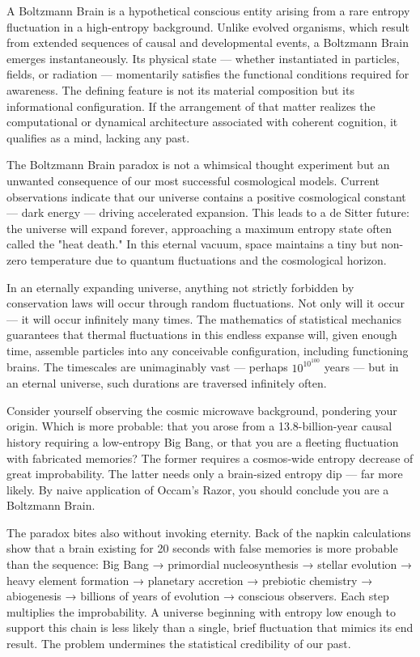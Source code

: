 A Boltzmann Brain is a hypothetical conscious entity arising from a rare entropy fluctuation in a high-entropy background. Unlike evolved organisms, which result from extended sequences of causal and developmental events, a Boltzmann Brain emerges instantaneously. Its physical state — whether instantiated in particles, fields, or radiation — momentarily satisfies the functional conditions required for awareness. The defining feature is not its material composition but its informational configuration. If the arrangement of that matter realizes the computational or dynamical architecture associated with coherent cognition, it qualifies as a mind, lacking any past.

The Boltzmann Brain paradox is not a whimsical thought experiment but an unwanted consequence of our most successful cosmological models. Current observations indicate that our universe contains a positive cosmological constant — dark energy — driving accelerated expansion. This leads to a de Sitter future: the universe will expand forever, approaching a maximum entropy state often called the "heat death." In this eternal vacuum, space maintains a tiny but non-zero temperature due to quantum fluctuations and the cosmological horizon.

In an eternally expanding universe, anything not strictly forbidden by conservation laws will occur through random fluctuations. Not only will it occur — it will occur infinitely many times. The mathematics of statistical mechanics guarantees that thermal fluctuations in this endless expanse will, given enough time, assemble particles into any conceivable configuration, including functioning brains. The timescales are unimaginably vast — perhaps $10^{10^{100}}$ years — but in an eternal universe, such durations are traversed infinitely often.

Consider yourself observing the cosmic microwave background, pondering your origin. Which is more probable: that you arose from a 13.8-billion-year causal history requiring a low-entropy Big Bang, or that you are a fleeting fluctuation with fabricated memories? The former requires a cosmos-wide entropy decrease of great improbability. The latter needs only a brain-sized entropy dip — far more likely. By naive application of Occam's Razor, you should conclude you are a Boltzmann Brain.

The paradox bites also without invoking eternity. Back of the napkin calculations show that a brain existing for 20 seconds with false memories is more probable than the sequence: Big Bang → primordial nucleosynthesis → stellar evolution → heavy element formation → planetary accretion → prebiotic chemistry → abiogenesis → billions of years of evolution → conscious observers. Each step multiplies the improbability. A universe beginning with entropy low enough to support this chain is less likely than a single, brief fluctuation that mimics its end result. The problem undermines the statistical credibility of our past.

